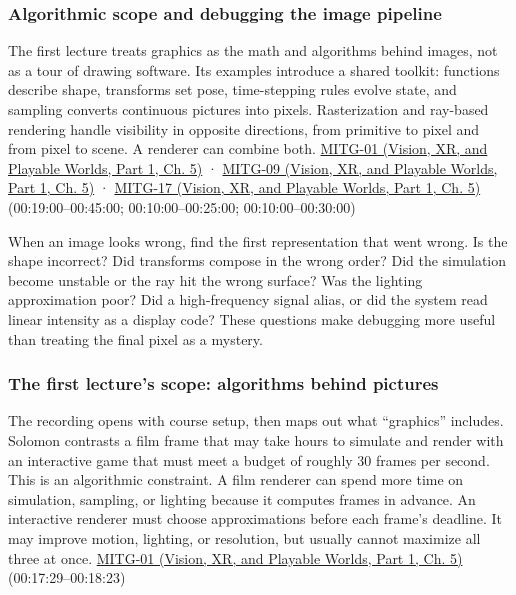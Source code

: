 \subsubsection{Algorithmic scope and debugging the image pipeline}\label{03-visual-computing-i-ch001-algorithmic-scope-and-debugging-the-image-pipeline}

\hypertarget{03-visual-computing-i-ch001-algorithmic-scope-and-debugging-the-image-pipeline}{}

The first lecture treats graphics as the math and algorithms behind images, not as a tour of drawing software. Its examples introduce a shared toolkit: functions describe shape, transforms set pose, time-stepping rules evolve state, and sampling converts continuous pictures into pixels. Rasterization and ray-based rendering handle visibility in opposite directions, from primitive to pixel and from pixel to scene. A renderer can combine both. \href{../07-Vision-XR-and-Playable-Worlds-P01/main.pdf\#04-visual-computing-ii-ch036-mitg-01---introduction}{MITG-01 (Vision, XR, and Playable Worlds, Part 1, Ch. 5)} · \href{../07-Vision-XR-and-Playable-Worlds-P01/main.pdf\#04-visual-computing-ii-ch036-mitg-09---ray-casting}{MITG-09 (Vision, XR, and Playable Worlds, Part 1, Ch. 5)} · \href{../07-Vision-XR-and-Playable-Worlds-P01/main.pdf\#04-visual-computing-ii-ch036-mitg-17---rasterization}{MITG-17 (Vision, XR, and Playable Worlds, Part 1, Ch. 5)} (00:19:00--00:45:00; 00:10:00--00:25:00; 00:10:00--00:30:00)

When an image looks wrong, find the first representation that went wrong. Is the shape incorrect? Did transforms compose in the wrong order? Did the simulation become unstable or the ray hit the wrong surface? Was the lighting approximation poor? Did a high-frequency signal alias, or did the system read linear intensity as a display code? These questions make debugging more useful than treating the final pixel as a mystery.

\subsubsection{The first lecture's scope: algorithms behind pictures}\label{03-visual-computing-i-ch001-the-first-lectures-scope-algorithms-behind-pictures}

\hypertarget{03-visual-computing-i-ch001-the-first-lectures-scope-algorithms-behind-pictures}{}

The recording opens with course setup, then maps out what ``graphics'' includes. Solomon contrasts a film frame that may take hours to simulate and render with an interactive game that must meet a budget of roughly 30 frames per second. This is an algorithmic constraint. A film renderer can spend more time on simulation, sampling, or lighting because it computes frames in advance. An interactive renderer must choose approximations before each frame's deadline. It may improve motion, lighting, or resolution, but usually cannot maximize all three at once. \href{../07-Vision-XR-and-Playable-Worlds-P01/main.pdf\#04-visual-computing-ii-ch036-mitg-01---introduction}{MITG-01 (Vision, XR, and Playable Worlds, Part 1, Ch. 5)} (00:17:29--00:18:23)


